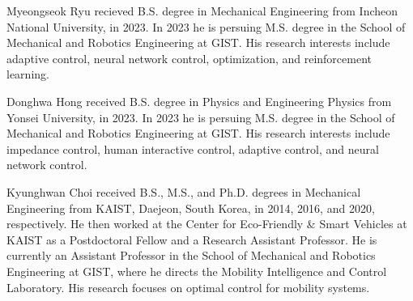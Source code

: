 \documentclass[lettersize,journal]{IEEEtran}
\begin{document}





\begin{IEEEbiography}{Myeongseok Ryu}
recieved B.S. degree in Mechanical Engineering from Incheon National University, in 2023. In 2023 he is persuing M.S. degree in the School of Mechanical and Robotics Engineering at GIST. His research interests include adaptive control, neural network control, optimization, and reinforcement learning.
\end{IEEEbiography}

\begin{IEEEbiography}{Donghwa Hong}
received B.S. degree in Physics and Engineering Physics from Yonsei University, in 2023. In 2023 he is persuing M.S. degree in the School of Mechanical and Robotics Engineering at GIST. His research interests include impedance control, human interactive control, adaptive control, and neural network control.  
\end{IEEEbiography}

\begin{IEEEbiography}{Kyunghwan Choi}
received B.S., M.S., and Ph.D. degrees in Mechanical Engineering from KAIST, Daejeon, South Korea, in 2014, 2016, and 2020, respectively. He then worked at the Center for Eco-Friendly \& Smart Vehicles at KAIST as a Postdoctoral Fellow and a Research Assistant Professor. He is currently an Assistant Professor in the School of Mechanical and Robotics Engineering at GIST, where he directs the Mobility Intelligence and Control Laboratory. His research focuses on optimal control for mobility systems.
\end{IEEEbiography}
\end{document}
